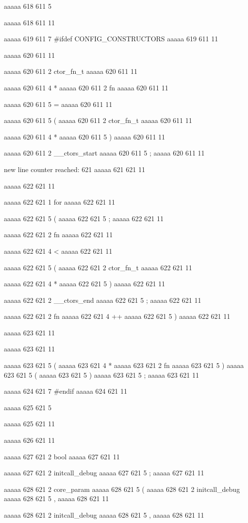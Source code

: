 aaaaa 618 611
5
{
aaaaa 618 611
11


aaaaa 619 611
7
#ifdef CONFIG_CONSTRUCTORS
aaaaa 619 611
11


aaaaa 620 611
11
	
aaaaa 620 611
2
ctor_fn_t
aaaaa 620 611
11
 
aaaaa 620 611
4
*
aaaaa 620 611
2
fn
aaaaa 620 611
11
 
aaaaa 620 611
5
=
aaaaa 620 611
11
 
aaaaa 620 611
5
(
aaaaa 620 611
2
ctor_fn_t
aaaaa 620 611
11
 
aaaaa 620 611
4
*
aaaaa 620 611
5
)
aaaaa 620 611
11
 
aaaaa 620 611
2
__ctors_start
aaaaa 620 611
5
;
aaaaa 620 611
11


new line counter reached: 621
aaaaa 621 621
11


aaaaa 622 621
11
	
aaaaa 622 621
1
for
aaaaa 622 621
11
 
aaaaa 622 621
5
(
aaaaa 622 621
5
;
aaaaa 622 621
11
 
aaaaa 622 621
2
fn
aaaaa 622 621
11
 
aaaaa 622 621
4
<
aaaaa 622 621
11
 
aaaaa 622 621
5
(
aaaaa 622 621
2
ctor_fn_t
aaaaa 622 621
11
 
aaaaa 622 621
4
*
aaaaa 622 621
5
)
aaaaa 622 621
11
 
aaaaa 622 621
2
__ctors_end
aaaaa 622 621
5
;
aaaaa 622 621
11
 
aaaaa 622 621
2
fn
aaaaa 622 621
4
++
aaaaa 622 621
5
)
aaaaa 622 621
11


aaaaa 623 621
11
	
aaaaa 623 621
11
	
aaaaa 623 621
5
(
aaaaa 623 621
4
*
aaaaa 623 621
2
fn
aaaaa 623 621
5
)
aaaaa 623 621
5
(
aaaaa 623 621
5
)
aaaaa 623 621
5
;
aaaaa 623 621
11


aaaaa 624 621
7
#endif
aaaaa 624 621
11


aaaaa 625 621
5
}
aaaaa 625 621
11


aaaaa 626 621
11


aaaaa 627 621
2
bool
aaaaa 627 621
11
 
aaaaa 627 621
2
initcall_debug
aaaaa 627 621
5
;
aaaaa 627 621
11


aaaaa 628 621
2
core_param
aaaaa 628 621
5
(
aaaaa 628 621
2
initcall_debug
aaaaa 628 621
5
,
aaaaa 628 621
11
 
aaaaa 628 621
2
initcall_debug
aaaaa 628 621
5
,
aaaaa 628 621
11
 

